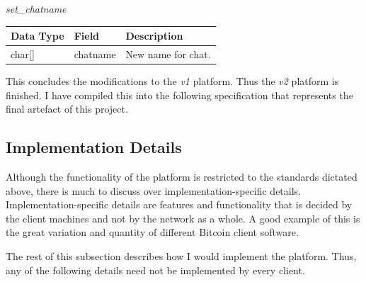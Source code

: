 \documentclass{article}
\begin{document}
\begin{center}
    \Large{\textit{set\_chatname}}
\end{center}
\begin{table}[H]
\centering
\begin{tabular}{|p{1.3cm}|p{2.5cm}|p{5.5cm}|}
\hline
\rowcolor{tblgrey} 
Data Type       & Field           & Description                                               \\ \hline
char[\hspace{0.05cm}] & chatname        & New name for chat.                                        \\ \hline
\end{tabular}
\end{table}

\vspace{1cm}
This concludes the modifications to the \textit{v1} platform. Thus the \textit{v2} platform is finished.
I have compiled this into the following specification that represents the final artefact of this project.



\newpage

\subsection{Implementation Details}
Although the functionality of the platform is restricted to the standards dictated above, there is much to discuss over implementation-specific details. Implementation-specific details are features and functionality that is decided by the client machines and not by the network as a whole. A good example of this is the great variation and quantity of different Bitcoin client software.

The rest of this subsection describes how I would implement the platform. Thus, any of the following details need not be implemented by every client.
\end{document}
